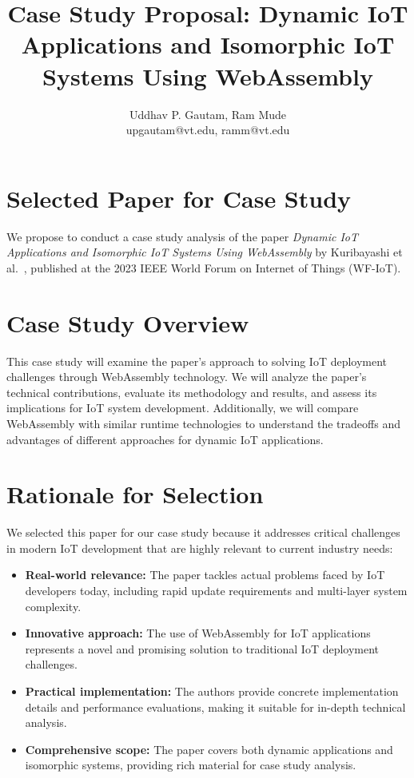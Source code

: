 \documentclass[11pt]{article}
\title{Case Study Proposal: Dynamic IoT Applications and Isomorphic IoT Systems Using WebAssembly}
\author{Uddhav P. Gautam, Ram Mude\\
\small upgautam@vt.edu, ramm@vt.edu}
\date{}
\begin{document}
\maketitle

\singlespacing


\section*{Selected Paper for Case Study}
We propose to conduct a case study analysis of the paper \emph{Dynamic IoT Applications and Isomorphic IoT Systems Using WebAssembly} by Kuribayashi et al.~\cite{10539584}, published at the 2023 IEEE World Forum on Internet of Things (WF-IoT).

\section*{Case Study Overview}
This case study will examine the paper's approach to solving IoT deployment challenges through WebAssembly technology. We will analyze the paper's technical contributions, evaluate its methodology and results, and assess its implications for IoT system development. Additionally, we will compare WebAssembly with similar runtime technologies to understand the tradeoffs and advantages of different approaches for dynamic IoT applications.

\section*{Rationale for Selection}
We selected this paper for our case study because it addresses critical challenges in modern IoT development that are highly relevant to current industry needs:

\begin{itemize}
\item \textbf{Real-world relevance:} The paper tackles actual problems faced by IoT developers today, including rapid update requirements and multi-layer system complexity.
\item \textbf{Innovative approach:} The use of WebAssembly for IoT applications represents a novel and promising solution to traditional IoT deployment challenges.
\item \textbf{Practical implementation:} The authors provide concrete implementation details and performance evaluations, making it suitable for in-depth technical analysis.
\item \textbf{Comprehensive scope:} The paper covers both dynamic applications and isomorphic systems, providing rich material for case study analysis.
\end{itemize}
\end{document}
